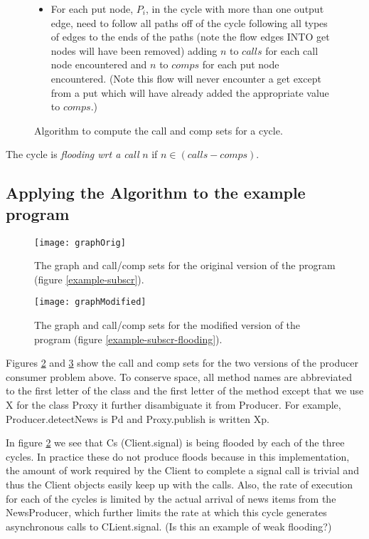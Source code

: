 \documentclass[12pt]{article}%
\begin{document}
\begin{figure}
\begin{shaded}
\begin{itemize}
\item For each put node, $P_i$, in the cycle with more than one output edge, need to follow all paths off of the cycle following
all types of edges to the ends of the paths (note the flow edges INTO get nodes will have been removed) adding ${n}$ to $calls$ for
each call node encountered and ${n}$ to $comps$ for each put node encountered. (Note this flow will never encounter a get except
from a put which will have already added the appropriate value to $comps$.)
\end{itemize}
\end{shaded}
\caption{\label{call-cons-analysis}
Algorithm to compute the call and comp sets for a cycle.}
\end{figure}

\begin{theorem}
The cycle is \emph{flooding wrt a call} $n$ if 
$n\in (calls -comps)$.
\end{theorem}

\subsection{Applying the Algorithm to the example program}


\begin{figure}[t]
\texttt{[image: graphOrig]}
\caption{\label{graph-orig}
The graph and call/comp sets for the original version of the program (figure \ref{example-subscr}).
}
\end{figure}

\begin{figure}[t]
\texttt{[image: graphModified]}
\caption{\label{graph-modified}
The graph and call/comp sets for the modified version of the program (figure \ref{example-subscr-flooding}).
}
\end{figure}


Figures \ref{graph-orig} and \ref{graph-modified} show the call and comp sets
for the two versions of the producer consumer problem above. To conserve space, all method names are abbreviated to the
first letter of the class and the first letter of the method except that we use X for the class Proxy it further disambiguate it from Producer. 
For example, Producer.detectNews is Pd and Proxy.publish is written Xp.

In figure \ref{graph-orig} we see that Cs (Client.signal) is being flooded by each of the three cycles. 
In practice these do not produce floods because in this implementation, the amount of work required by the
Client to complete a signal call is trivial and thus the Client objects easily keep up with the calls. Also, the rate of execution for 
each of the cycles is
limited by the actual arrival of news items from the NewsProducer, which further limits the rate at which this cycle generates asynchronous calls to
CLient.signal. (Is this an example of weak flooding?)
\end{document}
